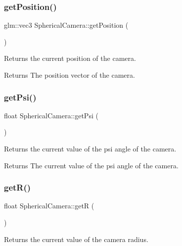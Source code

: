 \subsubsection{\texorpdfstring{get\+Position()}{getPosition()}}
{\footnotesize\ttfamily glm\+::vec3 Spherical\+Camera\+::get\+Position (\begin{DoxyParamCaption}{ }\end{DoxyParamCaption})}



Returns the current position of the camera. 

\begin{DoxyReturn}{Returns}
The position vector of the camera. 
\end{DoxyReturn}
\mbox{\label{class_spherical_camera_a8ca237a1f3e1bdff465d7758cdc9344c}} 
\subsubsection{\texorpdfstring{get\+Psi()}{getPsi()}}
{\footnotesize\ttfamily float Spherical\+Camera\+::get\+Psi (\begin{DoxyParamCaption}{ }\end{DoxyParamCaption})}



Returns the current value of the psi angle of the camera. 

\begin{DoxyReturn}{Returns}
The current value of the psi angle of the camera. 
\end{DoxyReturn}
\mbox{\label{class_spherical_camera_adb5813e85f77377107927ddd4252e587}} 
\subsubsection{\texorpdfstring{get\+R()}{getR()}}
{\footnotesize\ttfamily float Spherical\+Camera\+::getR (\begin{DoxyParamCaption}{ }\end{DoxyParamCaption})}



Returns the current value of the camera radius. 

